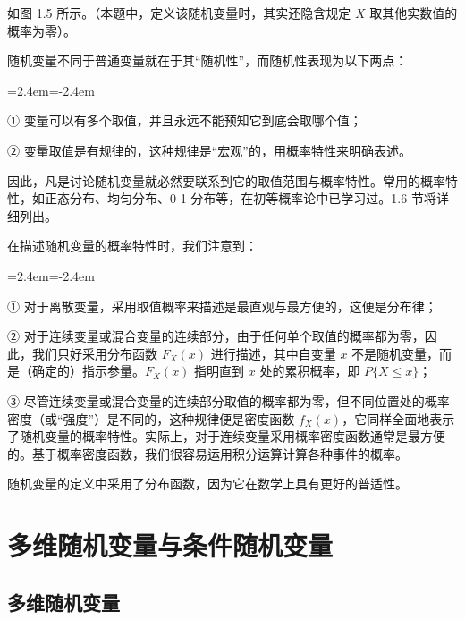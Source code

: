 \documentclass[11pt,openany,UTF8]{ctexbook}
\newenvironment{citemize}
  {\begin{list}{}{\leftmargin=2.4em\itemindent=-2.4em\itemsep=1pt\topsep=3pt\parsep=0pt}}
  {\end{list}}
\begin{document}
如图 1.5 所示\nobreak。（本题中\nobreak，定义该随机变量时\nobreak，其实还隐含规定 $X$ 取其他实数值的概率为零\nobreak）\nobreak。

随机变量不同于普通变量就在于其“随机性”\nobreak，而随机性表现为以下两点\nobreak：

\begin{citemize}
  \item ① 变量可以有多个取值\nobreak，并且永远不能预知它到底会取哪个值\nobreak；
  \item ② 变量取值是有规律的\nobreak，这种规律是“宏观”的\nobreak，用概率特性来明确表述\nobreak。
\end{citemize}

因此\nobreak，凡是讨论随机变量就必然要联系到它的取值范围与概率特性\nobreak。常用的概率特性\nobreak，如正态分布\nobreak、均匀分布\nobreak、0-1 分布等\nobreak，在初等概率论中已学习过\nobreak。1.6 节将详细列出\nobreak。

在描述随机变量的概率特性时\nobreak，我们注意到\nobreak：

\begin{citemize}
  \item ① 对于离散变量\nobreak，采用取值概率来描述是最直观与最方便的\nobreak，这便是分布律\nobreak；
  \item ② 对于连续变量或混合变量的连续部分\nobreak，由于任何单个取值的概率都为零\nobreak，因此\nobreak，我们只好采用分布函数 $F_X(x)$ 进行描述\nobreak，其中自变量 $x$ 不是随机变量\nobreak，而是（确定的\nobreak）指示参量\nobreak。$F_X(x)$ 指明直到 $x$ 处的累积概率\nobreak，即 $P\{X\leqslant x\}$\nobreak；
  \item ③ 尽管连续变量或混合变量的连续部分取值的概率都为零\nobreak，但不同位置处的概率密度（或“强度”\nobreak）是不同的\nobreak，这种规律便是密度函数 $f_X(x)$\nobreak，它同样全面地表示了随机变量的概率特性\nobreak。实际上\nobreak，对于连续变量采用概率密度函数通常是最方便的\nobreak。基于概率密度函数\nobreak，我们很容易运用积分运算计算各种事件的概率\nobreak。
\end{citemize}

随机变量的定义中采用了分布函数\nobreak，因为它在数学上具有更好的普适性\nobreak。

\section{多维随机变量与条件随机变量}

\subsection{多维随机变量}
\end{document}
